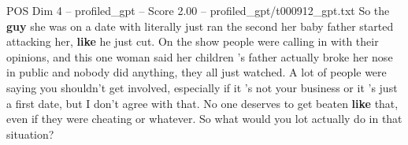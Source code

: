\begin{textsample}{POS Dim 4 – profiled\_gpt – Score 2.00 – profiled\_gpt/t000912\_gpt.txt}  \label{ex:f4_pos_040}
So the \textbf{guy} she was on a date with literally just ran the second her baby father started attacking her, \textbf{like} he just cut.
On the show people were calling in with their opinions, and this one woman said her children ’s father actually broke her nose in public and nobody did anything, they all just watched.
A lot of people were saying you shouldn't get involved, especially if it ’s not your business or it ’s just a first date, but I don't agree with that.
No one deserves to get beaten \textbf{like} that, even if they were cheating or whatever.
So what would you lot actually do in that situation?

\end{textsample}
